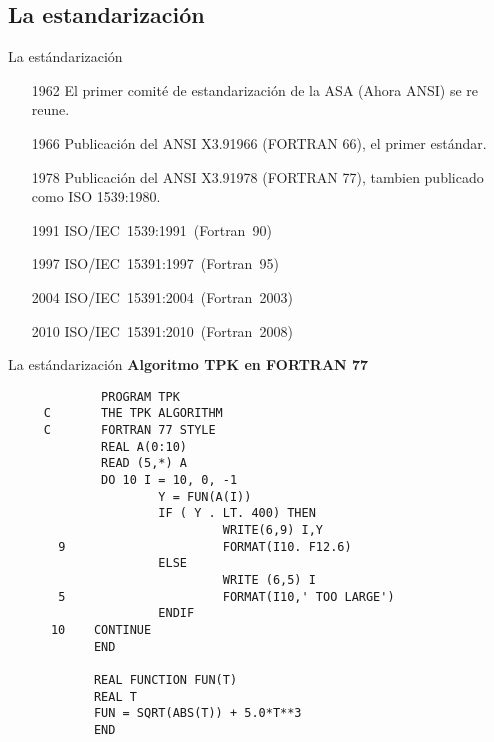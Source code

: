 \subsection{La estandarización}
\begin{frame}[fragile]{La estándarización}
  \begin{itemize}[<+(1)->]
    \item[1962] El primer comité de estandarización de la ASA (Ahora ANSI) se re reune.
    \item[1966] Publicación del ANSI X3.91966 (FORTRAN 66), el primer estándar.
    \item[1978] Publicación del ANSI X3.91978 (FORTRAN 77), tambien publicado como ISO 1539:1980.
    \item[1991] ISO/IEC 1539:1991 (Fortran 90)
    \item[1997] ISO/IEC 1539­1:1997 (Fortran 95)
    \item[2004] ISO/IEC 1539­1:2004 (Fortran 2003)
    \item[2010] ISO/IEC 1539­1:2010 (Fortran 2008)
  \end{itemize}
\end{frame}


\begin{frame}[fragile]{La estándarización}
    \textbf{Algoritmo TPK en FORTRAN 77}
    \begin{verbatim}
             PROGRAM TPK
     C       THE TPK ALGORITHM
     C       FORTRAN 77 STYLE
             REAL A(0:10)
             READ (5,*) A
             DO 10 I = 10, 0, -1
                     Y = FUN(A(I))
                     IF ( Y . LT. 400) THEN
                              WRITE(6,9) I,Y
       9                      FORMAT(I10. F12.6)
                     ELSE
                              WRITE (6,5) I
       5                      FORMAT(I10,' TOO LARGE')
                     ENDIF
      10    CONTINUE
            END

            REAL FUNCTION FUN(T)
            REAL T
            FUN = SQRT(ABS(T)) + 5.0*T**3
            END
    \end{verbatim}
\end{frame}


